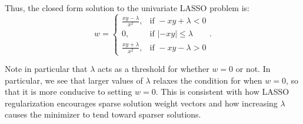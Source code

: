 \begin{Parts}
\begin{solution}
    Thus, the closed form solution to the univariate LASSO problem is:
    \[
        w = \begin{cases}
            \frac{xy - \lambda}{x^{2}}, & \text{if } -xy + \lambda < 0 \\
            0, & \text{if } |-xy| \leq \lambda \\
            \frac{xy + \lambda}{x^{2}}, & \text{if } -xy - \lambda > 0
        \end{cases}
    .\] 

    Note in particular that $\lambda$ acts as a threshold for whether $w = 0$
    or not. In particular, we see that larger values of $\lambda$ relaxes the
    condition for when $w = 0$, so that it is more conducive to setting $w =
    0$. This is consistent with how LASSO regularization encourages sparse
    solution weight vectors and how increasing $\lambda$ causes the minimizer
    to tend toward sparser solutions.
\end{solution}

\end{Parts}
